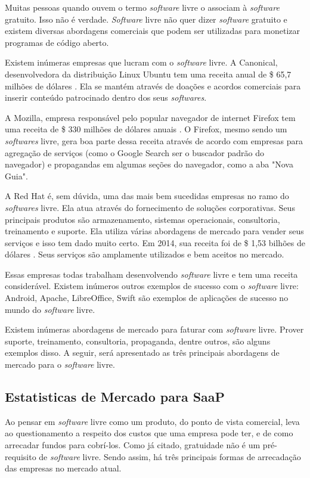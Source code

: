 \documentclass{classe_cn}                 %
\begin{document}
Muitas pessoas quando ouvem o termo \textit{software} livre o associam à \textit{software} gratuito. Isso não é verdade. \textit{Software} livre não quer dizer \textit{software} gratuito e existem diversas abordagens comerciais que podem ser utilizadas para monetizar programas de código aberto.

Existem inúmeras empresas que lucram com o \textit{software} livre. A Canonical, desenvolvedora da distribuição Linux Ubuntu tem uma receita anual de \$ 65,7 milhões de dólares \cite{Brodkin}. Ela se mantém através de doações e acordos comerciais para inserir conteúdo patrocinado dentro dos seus \textit{softwares}.

A Mozilla, empresa responsável pelo popular navegador de internet Firefox tem uma receita de \$ 330 milhões de dólares anuais \cite{Mozilla}. O Firefox, mesmo sendo  um \textit{softwares} livre, gera boa parte dessa receita através de acordo com empresas para agregação de serviços (como o Google Search ser o buscador padrão do navegador) e propagandas em algumas seções do navegador, como a aba "Nova Guia".

A Red Hat é, sem dúvida, uma das mais bem sucedidas empresas no ramo do \textit{softwares} livre. Ela atua através do fornecimento de soluções corporativas. Seus principais produtos são armazenamento, sistemas operacionais, consultoria, treinamento e suporte. Ela utiliza várias abordagens de mercado para vender seus serviços e isso tem dado muito certo. Em 2014, sua receita foi de \$ 1,53 bilhões de dólares \cite{Red}. Seus serviços são amplamente utilizados e bem aceitos no mercado.

Essas empresas todas trabalham desenvolvendo \textit{software} livre e tem uma receita considerável. Existem inúmeros outros exemplos de sucesso com o \textit{software} livre: Android, Apache, LibreOffice, Swift são exemplos de aplicações de sucesso no mundo do \textit{software} livre. 

Existem inúmeras abordagens de mercado para faturar com \textit{software} livre. Prover suporte, treinamento, consultoria, propaganda, dentre outros, são alguns exemplos disso. A seguir, será apresentado as três principais abordagens de mercado para o \textit{software} livre.

\subsection{Estatisticas de Mercado para SaaP}

Ao pensar em \textit{software} livre como um produto, do ponto de vista comercial, leva ao questionamento a respeito dos custos que uma empresa pode ter, e de como arrecadar fundos para cobrí-los. Como já citado, gratuidade não é um pré-requisito de \textit{software} livre. Sendo assim, há três principais formas de arrecadação das empresas no mercado atual.
\end{document}
